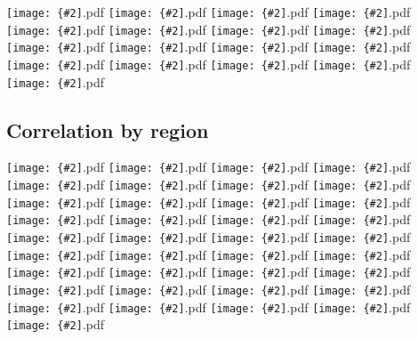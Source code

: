 \documentclass[12pt,a4paper]{article}
\newcommand{\pdffig}[2][0.5]{\texttt{[image: \{\#2]}.pdf}}
\begin{document}
\pdffig[0.5]{Correlation_SthSthAm_tsfc_u_low}
\pdffig[0.5]{Correlation_SthSthAm_tsfc_v_high}
\pdffig[0.5]{Correlation_SthSthAm_tsfc_v_low}
\pdffig[0.5]{Correlation_SthSthAm_tsfc_w_high}
\pdffig[0.5]{Correlation_SthSthAm_tsfc_w_low}
\pdffig[0.5]{Correlation_TropAfr_tsfc_u_hig}
\pdffig[0.5]{Correlation_TropAfr_tsfc_u_low}
\pdffig[0.5]{Correlation_TropAfr_tsfc_v_high}
\pdffig[0.5]{Correlation_TropAfr_tsfc_v_low}
\pdffig[0.5]{Correlation_TropAfr_tsfc_w_high}
\pdffig[0.5]{Correlation_TropAfr_tsfc_w_low}
\pdffig[0.5]{Correlation_TropSthAm_tsfc_u_hig}
\pdffig[0.5]{Correlation_TropSthAm_tsfc_u_low}
\pdffig[0.5]{Correlation_TropSthAm_tsfc_v_high}
\pdffig[0.5]{Correlation_TropSthAm_tsfc_v_low}
\pdffig[0.5]{Correlation_TropSthAm_tsfc_w_high}
\pdffig[0.5]{Correlation_TropSthAm_tsfc_w_low}


\subsection{Correlation by region}
\noindent\pdffig[0.5]{Correlation_Aus_tsfc_dlwr}
\pdffig[0.5]{Correlation_Aus_tsfc_dswr}
\pdffig[0.5]{Correlation_Aus_tsfc_lhf}
\pdffig[0.5]{Correlation_Aus_tsfc_precip}
\pdffig[0.5]{Correlation_Aus_tsfc_rhum}
\pdffig[0.5]{Correlation_Aus_tsfc_sfc_temp}
\pdffig[0.5]{Correlation_Aus_tsfc_shf}
\pdffig[0.5]{Correlation_Aus_tsfc_smc}
\pdffig[0.5]{Correlation_India_tsfc_dlwr}
\pdffig[0.5]{Correlation_India_tsfc_dswr}
\pdffig[0.5]{Correlation_India_tsfc_lhf}
\pdffig[0.5]{Correlation_India_tsfc_precip}
\pdffig[0.5]{Correlation_India_tsfc_rhum}
\pdffig[0.5]{Correlation_India_tsfc_sfc_temp}
\pdffig[0.5]{Correlation_India_tsfc_shf}
\pdffig[0.5]{Correlation_India_tsfc_smc}
\pdffig[0.5]{Correlation_MC_tsfc_dlwr}
\pdffig[0.5]{Correlation_MC_tsfc_dswr}
\pdffig[0.5]{Correlation_MC_tsfc_lhf}
\pdffig[0.5]{Correlation_MC_tsfc_precip}
\pdffig[0.5]{Correlation_MC_tsfc_rhum}
\pdffig[0.5]{Correlation_MC_tsfc_sfc_temp}
\pdffig[0.5]{Correlation_MC_tsfc_shf}
\pdffig[0.5]{Correlation_MC_tsfc_smc}
\pdffig[0.5]{Correlation_NthEastAfr_tsfc_dlwr}
\pdffig[0.5]{Correlation_NthEastAfr_tsfc_dswr}
\pdffig[0.5]{Correlation_NthEastAfr_tsfc_lhf}
\pdffig[0.5]{Correlation_NthEastAfr_tsfc_precip}
\pdffig[0.5]{Correlation_NthEastAfr_tsfc_rhum}
\pdffig[0.5]{Correlation_NthEastAfr_tsfc_sfc_temp}
\pdffig[0.5]{Correlation_NthEastAfr_tsfc_shf}
\pdffig[0.5]{Correlation_NthEastAfr_tsfc_smc}
\pdffig[0.5]{Correlation_NthWestAfr_tsfc_dlwr}
\pdffig[0.5]{Correlation_NthWestAfr_tsfc_dswr}
\pdffig[0.5]{Correlation_NthWestAfr_tsfc_lhf}
\pdffig[0.5]{Correlation_NthWestAfr_tsfc_precip}
\pdffig[0.5]{Correlation_NthWestAfr_tsfc_rhum}
\end{document}
